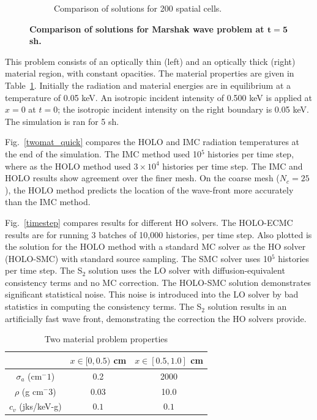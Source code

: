 \documentclass{mc2013}
\begin{document}
\begin{figure}
\begin{subfigure}{0.5\textwidth}
  \caption{\label{marshak_200_compare}  Comparison of solutions for 200 spatial cells. }
\end{subfigure}
\caption{\bf Comparison of solutions for Marshak wave problem at $\mathbf{t=5}$ sh.}
\end{figure}


This problem consists of an optically thin (left) and an optically thick (right) material region,
with constant opacities.  The material properties are given in
Table~\ref{two_mat_props}.  Initially the radiation and material energies are in
equilibrium at a temperature of 0.05 keV.  An isotropic incident intensity of 0.500 keV
is applied at $x=0$ at $t=0$; the isotropic incident intensity on the right boundary is 0.05
keV.  The simulation is ran for 5 sh.

Fig.~\ref{twomat_quick} compares the HOLO and IMC radiation 
temperatures at the end of the simulation. The IMC method used 10$^5$ histories per
time step, where as the HOLO method used $3\times10^4$ histories per time step.  The IMC and HOLO results show agreement
over the finer mesh.
On the coarse mesh ($N_c=25$), the HOLO method predicts the location of the
wave-front more accurately than the IMC method. 

Fig.~\ref{timestep} compares results for different HO solvers.  The HOLO-ECMC results
are for running 3 batches of 10,000 histories, per time step. Also plotted is
the solution for the HOLO method with a standard MC solver as the HO solver
(HOLO-SMC) with
standard source sampling. The SMC
solver uses 10$^5$ histories per time step.  The S$_2$ solution uses the LO
solver with diffusion-equivalent consistency terms and no MC correction.  The HOLO-SMC solution demonstrates significant
statistical noise.  This noise is introduced into the LO solver by bad statistics in
computing the consistency terms. The S$_2$ solution results in an artificially fast
wave front, demonstrating the correction the HO solvers provide.
\begin{table}[htb]
    \begin{center}
        \begin{tabular}{|c|cc|}  \cline{2-3}
            \multicolumn{1}{c|}{}   & $x \in [0,0.5)$ cm & $x \in [0.5,1.0]$ cm   \\ \hline
            $\sigma_a$ (cm$^-1$)  & 0.2 & 2000 \\
            $\rho$ (g cm$^-3$) & 0.03 & 10.0 \\
            $c_v$ (jks/keV-g) & $0.1$ & $0.1$ \\ \hline
        \end{tabular}
        \caption{Two material problem properties \label{two_mat_props}}
    \end{center}
\end{table}
\end{document}

